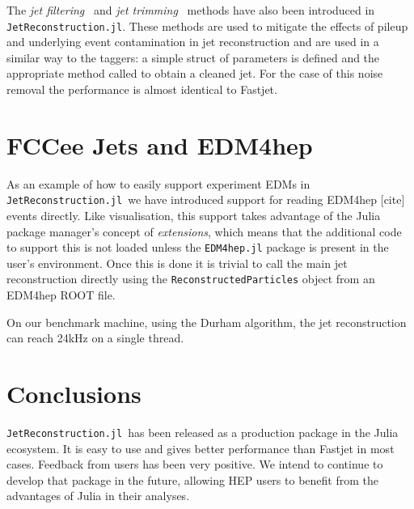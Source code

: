 \documentclass{webofc}
\newcommand{\JR}{\texttt{JetReconstruction.jl}}
\begin{document}
The \emph{jet filtering}~\cite{Butterworth_2008} and \emph{jet
trimming}~\cite{Krohn_2010} methods have also been introduced in \JR. These
methods are used to mitigate the effects of pileup and underlying event
contamination in jet reconstruction and are used in a similar way to the
taggers: a simple struct of parameters is defined and the appropriate method
called to obtain a cleaned jet. For the case of this noise removal the
performance is almost identical to Fastjet.

\section{FCCee Jets and EDM4hep}
\label{sec:fccee}

As an example of how to easily support experiment EDMs in \JR\ we have
introduced support for reading EDM4hep [cite] events directly. Like
visualisation, this support takes advantage of the Julia package manager's
concept of \emph{extensions}, which means that the additional code to support
this is not loaded unless the \texttt{EDM4hep.jl} package is present in the
user's environment. Once this is done it is trivial to call the main jet
reconstruction directly using the \texttt{ReconstructedParticles} object from an
EDM4hep ROOT file.

On our benchmark machine, using the Durham algorithm, the jet reconstruction can
reach 24kHz on a single thread.

\section{Conclusions}
\label{sec:conclusions}

\JR\ has been released as a production package in the Julia ecosystem. It is
easy to use and gives better performance than Fastjet in most cases. Feedback
from users has been very positive. We intend to continue to develop that package
in the future, allowing HEP users to benefit from the advantages of Julia in
their analyses.

\sloppy
\raggedright

\end{document}
